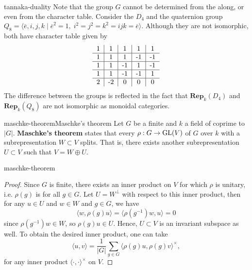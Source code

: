 \begin{example}{tannaka-duality}
    Note that the group $G$ cannot be determined from the  along, or even from the character table. Consider the  $D_4$ and the quaternion group $Q_8 = \langle \overline{e}, i, j, k \;|\; \overline{e}^2 = 1, \; i^2 = j^2 = k^2 = ijk = \overline{e} \rangle$. Although they are not isomorphic, both have character table given by
    \[ \begin{tabular}{c|c|c|c|c}
        1 & 1 & 1 & 1 & 1 \\ \hline
        1 & 1 & 1 & -1 & -1 \\ \hline
        1 & 1 & -1 & 1 & -1 \\ \hline
        1 & 1 & -1 & -1 & 1 \\ \hline
        2 & -2 & 0 & 0 & 0
    \end{tabular} \]
    The difference between the groups is reflected in the fact that $\textbf{Rep}_k(D_4)$ and $\textbf{Rep}_k(Q_8)$ are not isomorphic as monoidal categories.
\end{example}

\begin{topic}{maschke-theorem}{Maschke's theorem}
    Let $G$ be a finite  and $k$ a field of  coprime to $|G|$. \textbf{Maschke's theorem} states that every  $\rho : G \to \textup{GL}(V)$ of $G$ over $k$ with a subrepresentation $W \subset V$ splits. That is, there exists another subrepresentation $U \subset V$ such that $V = W \oplus U$.
\end{topic}

\begin{example}{maschke-theorem}
    \begin{proof}
        Since $G$ is finite, there exists an inner product on $V$ for which $\rho$ is unitary, i.e. $\rho(g)$ is  for all $g \in G$. Let $U = W^\perp$ with respect to this inner product, then for any $u \in U$ and $w \in W$ and $g \in G$, we have
        \[ \langle w, \rho(g) u \rangle = \langle \rho(g^{-1}) w, u \rangle = 0 \]
        since $\rho(g^{-1}) w \in W$, so $\rho(g) u \in U$. Hence, $U \subset V$ is an invariant subspace as well. To obtain the desired inner product, one can take
        \[ \langle u, v \rangle = \frac{1}{|G|} \sum_{g \in G} \langle \rho(g) u, \rho(g) v \rangle^\times , \]
        for any inner product $\langle \cdot, \cdot \rangle^\times$ on $V$.
    \end{proof}
\end{example}


